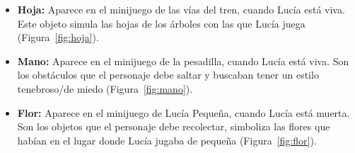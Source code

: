 \begin{itemize}
    \item \textbf{Hoja:} Aparece en el minijuego de las vías del tren, cuando Lucía está viva. Este objeto simula las hojas de los árboles con las que Lucía juega (Figura~\ref{fig:hoja}).
    \item \textbf{Mano:} Aparece en el minijuego de la pesadilla, cuando Lucía está viva. Son los obstáculos que el personaje debe saltar y buscaban tener un estilo tenebroso/de miedo (Figura~\ref{fig:mano}).
    \item \textbf{Flor:} Aparece en el minijuego de Lucía Pequeña, cuando Lucía está muerta. Son los objetos que el personaje debe recolectar, simboliza las flores que habían en el lugar donde Lucía jugaba de pequeña (Figura~\ref{fig:flor}).
\end{itemize}

